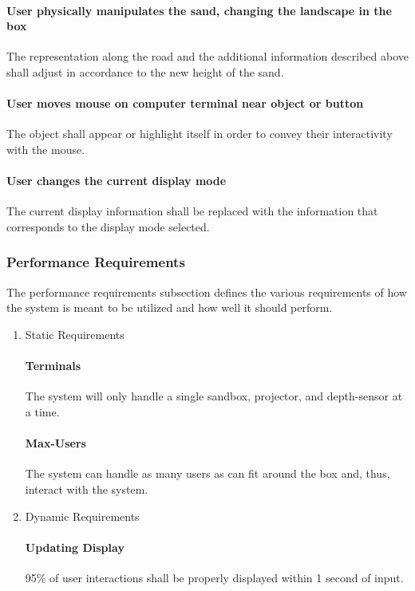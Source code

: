 \begin{enumerate}
\paragraph{User physically manipulates the sand, changing the landscape in the box}
The representation along the road and the additional information described above shall adjust in accordance to the new height of the sand.

\paragraph{User moves mouse on computer terminal near object or button}
The object shall appear or highlight itself in order to convey their interactivity with the mouse.

\paragraph{User changes the current display mode}
The current display information shall be replaced with the information that corresponds to the display mode selected.
\end{enumerate}

\subsubsection{Performance Requirements}

The performance requirements subsection defines the various requirements of how the system is meant to be utilized and how well it should perform.
\begin{enumerate}
\item{Static Requirements}
\paragraph{Terminals}
The system will only handle a single sandbox, projector, and depth-sensor at a time.
\paragraph{Max-Users}
The system can handle as many users as can fit around the box and, thus, interact with the system.
\item{Dynamic Requirements}
\paragraph{Updating Display}
95\% of user interactions shall be properly displayed within 1 second of input.
\end{enumerate}
